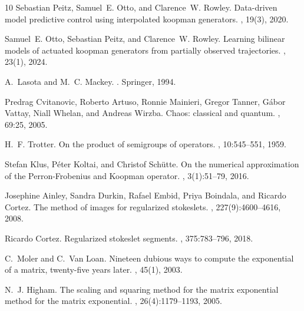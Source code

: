 \documentclass[pdflatex,sn-mathphys]{sn-jnl}%
\theoremstyle{thmstyleone}%
\theoremstyle{thmstyletwo}%
\theoremstyle{thmstylethree}%
\begin{document}
\begin{thebibliography}{10}
Sebastian Peitz, Samuel~E. Otto, and Clarence~W. Rowley.
\newblock Data-driven model predictive control using interpolated koopman generators.
, 19(3), 2020.

Samuel~E. Otto, Sebastian Peitz, and Clarence~W. Rowley.
\newblock Learning bilinear models of actuated koopman generators from partially observed trajectories.
, 23(1), 2024.

A.~Lasota and M.~C. Mackey.
.
\newblock Springer, 1994.

Predrag Cvitanovic, Roberto Artuso, Ronnie Mainieri, Gregor Tanner, G{\'a}bor Vattay, Niall Whelan, and Andreas Wirzba.
\newblock Chaos: classical and quantum.
, 69:25, 2005.

H.~F. Trotter.
\newblock On the product of semigroups of operators.
, 10:545--551, 1959.

Stefan Klus, Péter Koltai, and Christof Schütte.
\newblock On the numerical approximation of the {P}erron-{F}robenius and {K}oopman operator.
, 3(1):51--79, 2016.

Josephine Ainley, Sandra Durkin, Rafael Embid, Priya Boindala, and Ricardo Cortez.
\newblock The method of images for regularized stokeslets.
, 227(9):4600--4616, 2008.

Ricardo Cortez.
\newblock Regularized stokeslet segments.
, 375:783--796, 2018.

C.~Moler and C.~Van Loan.
\newblock Nineteen dubious ways to compute the exponential of a matrix, twenty-five years later.
, 45(1), 2003.

N.~J. Higham.
\newblock The scaling and squaring method for the matrix exponential method for the matrix exponential.
, 26(4):1179--1193, 2005.

\end{thebibliography}
\end{document}
